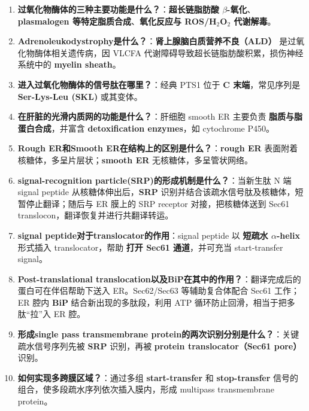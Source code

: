 \documentclass[12pt,fontset=none]{ctexart}
\begin{document}
\begin{enumerate}
\item \textbf{过氧化物酶体的三种主要功能是什么？}：\textbf{超长链脂肪酸 $\beta$-氧化}、\textbf{plasmalogen 等特定脂质合成}、\textbf{氧化反应与 ROS/H$_2$O$_2$ 代谢解毒}。

\item \textbf{Adrenoleukodystrophy是什么？}：\textbf{肾上腺脑白质营养不良（ALD）} 是过氧化物酶体相关遗传病，因 VLCFA 代谢障碍导致超长链脂肪酸积累，损伤神经系统中的 \textbf{myelin sheath}。

\item \textbf{进入过氧化物酶体的信号肽在哪里？}：经典 PTS1 位于 \textbf{C 末端}，常见序列是 \textbf{Ser-Lys-Leu (SKL)} 或其变体。

\item \textbf{在肝脏的光滑内质网的功能是什么？}：肝细胞 smooth ER 主要负责 \textbf{脂质与脂蛋白合成}，并富含 \textbf{detoxification enzymes}，如 cytochrome P450。

\item \textbf{Rough ER和Smooth ER在结构上的区别是什么？}：\textbf{rough ER} 表面附着核糖体，多呈片层状；\textbf{smooth ER} 无核糖体，多呈管状网络。

\item \textbf{signal-recognition particle(SRP)的形成机制是什么？}：当新生肽 N 端 signal peptide 从核糖体伸出后，\textbf{SRP} 识别并结合该疏水信号肽及核糖体，短暂停止翻译；随后与 ER 膜上的 SRP receptor 对接，把核糖体送到 Sec61 translocon，翻译恢复并进行共翻译转运。

\item \textbf{signal peptide对于translocator的作用}：signal peptide 以 \textbf{短疏水 $\alpha$-helix} 形式插入 translocator，帮助 \textbf{打开 Sec61 通道}，并可充当 start-transfer signal。

\item \textbf{Post-translational translocation以及BiP在其中的作用？}：翻译完成后的蛋白可在伴侣帮助下送入 ER。Sec62/Sec63 等辅助复合体配合 Sec61 工作；ER 腔内 \textbf{BiP} 结合新出现的多肽段，利用 ATP 循环防止回滑，相当于把多肽“拉”入 ER 腔。

\item \textbf{形成single pass transmembrane protein的两次识别分别是什么？}：关键疏水信号序列先被 \textbf{SRP} 识别，再被 \textbf{protein translocator（Sec61 pore）} 识别。

\item \textbf{如何实现多跨膜区域？}：通过多组 \textbf{start-transfer} 和 \textbf{stop-transfer} 信号的组合，使多段疏水序列依次插入膜内，形成 multipass transmembrane protein。


\end{enumerate}
\end{document}

